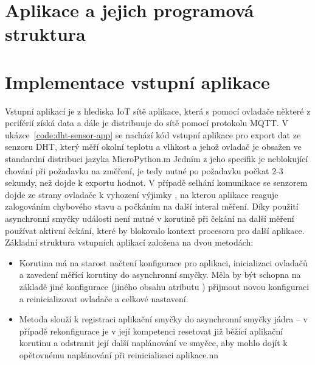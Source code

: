 
\section{Aplikace a jejich programová struktura}\label{sec:aplikace-a-jejich-programova-struktura}

\section{Implementace vstupní aplikace}\label{sec:implementace-vstupni-aplikace}
Vstupní aplikací je z hlediska IoT sítě aplikace, která s pomocí ovladače některé z periférií získá data a dále je
distribuuje do sítě pomocí protokolu MQTT.
V ukázce~\ref{code:dht-sensor-app} se nachází kód vstupní aplikace pro export dat ze senzoru DHT, který měří okolní
teplotu a vlhkost a jehož ovladač je obsažen ve standardní distribuci jazyka MicroPython.m
Jedním z jeho specifik je neblokující chování při požadavku na změření, je tedy nutné po požadavku počkat
2-3 sekundy, než dojde k exportu hodnot. 
V případě selhání komunikace se senzorem dojde ze strany ovladače k vyhození výjimky , na kterou aplikace
reaguje zalogováním chybového stavu a počkáním na další interal měření.
Díky použití asynchronní smyčky události není nutné v korutině  při čekání na další měření
používat aktivní čekání, které by blokovalo kontext procesoru pro další aplikace.
Základní struktura vstupních aplikací založena na dvou metodách:
\begin{itemize}
    \item Korutina  má na starost načtení konfigurace pro aplikaci, inicializaci ovladačů a zavedení
    měřící korutiny do asynchronní smyčky. Měla by být schopna na základě jiné konfigurace (jiného obsahu atributu
    ) přijmout novou konfiguraci a reinicializovat ovladače a celkové nastavení.
    \item Metoda  slouží k registraci aplikační smyčky do asynchronní smyčky jádra -- v případě
    rekonfigurace je v její kompetenci resetovat již běžící aplikační korutinu a odstranit její další naplánování ve
    smyčce, aby mohlo dojít k opětovnému naplánování při reinicializaci aplikace.nn
\end{itemize}

